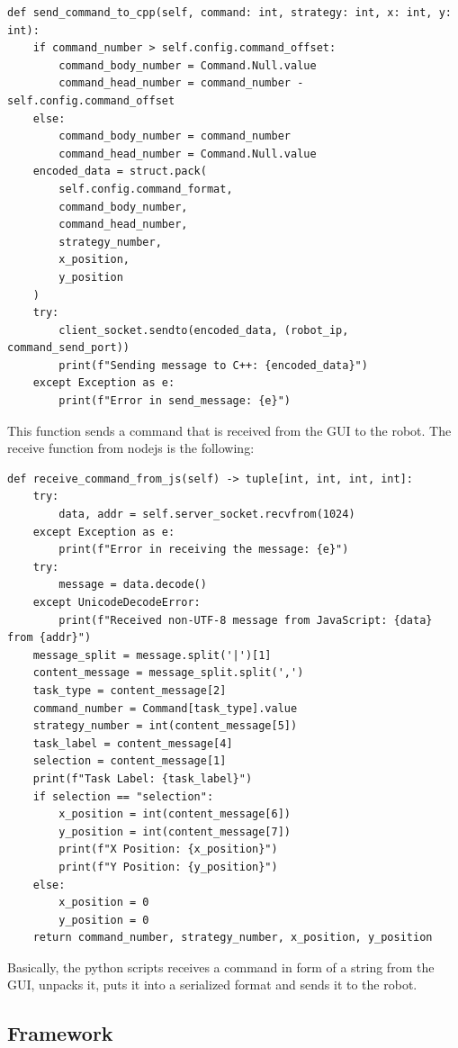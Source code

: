 \documentclass[a4paper, onecolumn, 12pt]{article}
\begin{document}
\begin{verbatim}
def send_command_to_cpp(self, command: int, strategy: int, x: int, y: int):
    if command_number > self.config.command_offset:
        command_body_number = Command.Null.value
        command_head_number = command_number - self.config.command_offset
    else:
        command_body_number = command_number
        command_head_number = Command.Null.value
    encoded_data = struct.pack(
        self.config.command_format,
        command_body_number,
        command_head_number,
        strategy_number,
        x_position,
        y_position
    )
    try:
        client_socket.sendto(encoded_data, (robot_ip, command_send_port))
        print(f"Sending message to C++: {encoded_data}")
    except Exception as e:
        print(f"Error in send_message: {e}")
\end{verbatim}

This function sends a command that is received from the GUI to the robot. The
receive function from nodejs is the following:

\begin{verbatim}
def receive_command_from_js(self) -> tuple[int, int, int, int]:
    try:
        data, addr = self.server_socket.recvfrom(1024)
    except Exception as e:
        print(f"Error in receiving the message: {e}")
    try:
        message = data.decode()
    except UnicodeDecodeError:
        print(f"Received non-UTF-8 message from JavaScript: {data} from {addr}")
    message_split = message.split('|')[1]
    content_message = message_split.split(',')
    task_type = content_message[2]
    command_number = Command[task_type].value
    strategy_number = int(content_message[5])
    task_label = content_message[4]
    selection = content_message[1]
    print(f"Task Label: {task_label}")
    if selection == "selection":
        x_position = int(content_message[6])
        y_position = int(content_message[7])
        print(f"X Position: {x_position}")
        print(f"Y Position: {y_position}")
    else:
        x_position = 0
        y_position = 0
    return command_number, strategy_number, x_position, y_position
\end{verbatim}
Basically, the python scripts receives a command in form of a string from the
GUI, unpacks it, puts it into a serialized format and sends it to the robot.


\subsection{Framework}
\end{document}
